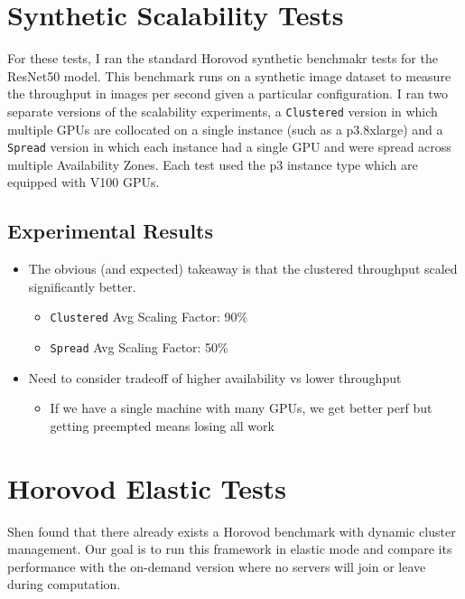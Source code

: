 \section{Synthetic Scalability Tests}
For these tests, I ran the standard Horovod synthetic benchmakr tests for
the ResNet50 model.
This benchmark runs on a synthetic image dataset to measure the throughput in
images per second given a particular configuration.
I ran two separate versions of the scalability experiments, a \texttt{Clustered}
version in which multiple GPUs are collocated on a single instance (such as a
p3.8xlarge) and a \texttt{Spread} version in which each instance had a single GPU and
were spread across multiple Availability Zones.
Each test used the p3 instance type which are equipped with V100 GPUs.

\begin{center}

\end{center}

\subsection{Experimental Results}
\begin{itemize}
    \item The obvious (and expected) takeaway is that the clustered throughput
        scaled significantly better.
    \begin{itemize}
        \item \texttt{Clustered} Avg Scaling Factor: 90\%
        \item \texttt{Spread} Avg Scaling Factor: 50\%
    \end{itemize}
    \item Need to consider tradeoff of higher availability vs lower throughput
    \begin{itemize}
        \item If we have a single machine with many GPUs, we get better perf
            but getting preempted means losing all work
    \end{itemize}
\end{itemize}


\section{Horovod Elastic Tests}
Shen found that there already exists a Horovod benchmark with dynamic
cluster management.
Our goal is to run this framework in elastic mode and compare its performance
with the on-demand version where no servers will join or leave during
computation.

